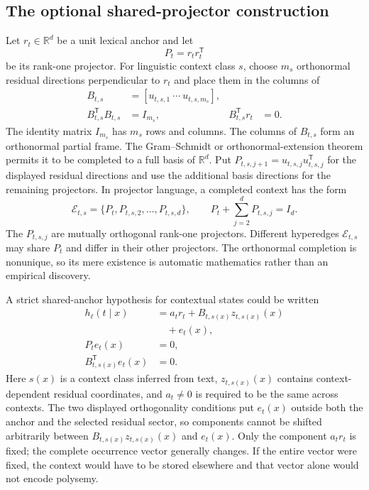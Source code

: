 \documentclass[
  aps,
  reprint,
  superscriptaddress,
  floatfix,
  nofootinbib,
  longbibliography
]{revtex4-2}
\newcommand{\R}{\mathbb{R}}
\newcommand{\T}{^{\mathsf T}}
\begin{document}
\subsection{The optional shared-projector construction}

Let $r_t\in\R^d$ be a unit lexical anchor and let
\begin{equation}
 P_t=r_t r_t\T
 \label{eq:lexical-projector-app}
\end{equation}
be its rank-one projector.  For linguistic context class $s$, choose
$m_s$ orthonormal residual directions perpendicular to $r_t$ and place them
in the columns of
\begin{equation}
\begin{aligned}
 B_{t,s}&=
 [u_{t,s,1}\ \cdots\ u_{t,s,m_s}],\\
 B_{t,s}\T B_{t,s}&=I_{m_s},
 &B_{t,s}\T r_t&=0.
\end{aligned}
 \label{eq:residual-basis-app}
\end{equation}
The identity matrix $I_{m_s}$ has $m_s$ rows and columns.  The columns of
$B_{t,s}$ form an orthonormal partial frame.  The Gram--Schmidt or
orthonormal-extension theorem permits it to be completed to a full basis of
$\R^d$.  Put $P_{t,s,j+1}=u_{t,s,j}u_{t,s,j}\T$ for the displayed residual
directions and use the additional basis directions for the remaining
projectors.  In projector language, a completed context has the form
\begin{equation}
 \mathcal E_{t,s}
 =\{P_t,P_{t,s,2},\ldots,P_{t,s,d}\},
 \qquad
 P_t+\sum_{j=2}^{d}P_{t,s,j}=I_d.
 \label{eq:context-hyperedge-app}
\end{equation}
The $P_{t,s,j}$ are mutually orthogonal rank-one projectors.  Different
hyperedges $\mathcal E_{t,s}$ may share $P_t$ and differ in their other
projectors.  The orthonormal completion is nonunique, so its mere existence is
automatic mathematics rather than an empirical discovery.

A strict shared-anchor hypothesis for contextual states could be written
\begin{equation}
\begin{aligned}
 h_\ell(t\mid x)
 &=a_t r_t+B_{t,s(x)}z_{t,s(x)}(x)\\
 &\quad+e_t(x),\\
 P_t e_t(x)&=0,\\
 B_{t,s(x)}\T e_t(x)&=0.
\end{aligned}
 \label{eq:shared-anchor-app}
\end{equation}
Here $s(x)$ is a context class inferred from text, $z_{t,s(x)}(x)$ contains
context-dependent residual coordinates, and $a_t\ne0$ is required to be the
same across contexts.  The two displayed orthogonality conditions put
$e_t(x)$ outside both the anchor and the selected residual sector, so
components cannot be shifted arbitrarily between $B_{t,s(x)}z_{t,s(x)}(x)$
and $e_t(x)$.  Only the component $a_t r_t$ is fixed; the complete
occurrence vector generally changes.  If the entire vector were fixed, the
context would have to be stored elsewhere and that vector alone would not
encode polysemy.
\end{document}
